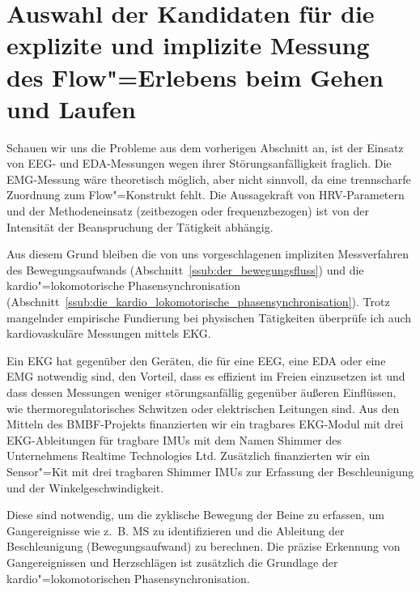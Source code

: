 

\section{Auswahl der Kandidaten für die explizite und implizite Messung des Flow"=Erlebens beim Gehen und Laufen} 

\label{sec:auswahl_der_kandidaten_fur_die_explizite_und_implizite_messung_des_flow_erlebens_beim_gehen_und_laufen}

Schauen wir uns die Probleme aus dem vorherigen Abschnitt an, ist der Einsatz von \acs{EEG}- und \ac{EDA}-Messungen wegen ihrer Störungsanfälligkeit fraglich. Die \ac{EMG}-Messung wäre theoretisch möglich, aber nicht sinnvoll, da eine trennscharfe Zuordnung zum Flow"=Konstrukt fehlt. Die Aussagekraft von \acs{HRV}-Parametern und der Methodeneinsatz (zeitbezogen oder frequenzbezogen) ist von der Intensität der Beanspruchung der Tätigkeit abhängig.

Aus diesem Grund bleiben die von uns vorgeschlagenen impliziten Messverfahren des Bewegungsaufwands (Abschnitt~\ref{ssub:der_bewegungsfluss}) und die kardio"=lokomotorische Phasensynchronisation (Abschnitt~\ref{ssub:die_kardio_lokomotorische_phasensynchronisation}). Trotz mangelnder empirische Fundierung bei physischen Tätigkeiten überprüfe ich auch kardiovaskuläre Messungen mittels \ac{EKG}. 

Ein \ac{EKG} hat gegenüber den Geräten, die für eine \acs{EEG}, eine \ac{EDA} oder eine \ac{EMG} notwendig sind, den Vorteil, dass es effizient im Freien einzusetzen ist und dass dessen Messungen weniger störungsanfällig gegenüber äußeren Einflüssen, wie thermoregulatorisches Schwitzen oder elektrischen Leitungen sind. Aus den Mitteln des \acs{BMBF}-Projekts finanzierten wir ein tragbares \ac{EKG}-Modul mit drei \ac{EKG}-Ableitungen für tragbare \acp{IMU} mit dem Namen Shimmer des Unternehmens Realtime Technologies Ltd. Zusätzlich finanzierten wir ein Sensor"=Kit mit drei tragbaren Shimmer \acp{IMU} zur Erfassung der Beschleunigung und der Winkelgeschwindigkeit.

Diese sind notwendig, um die zyklische Bewegung der Beine zu erfassen, um Gangereignisse wie z.~B. \ac{MS} zu identifizieren und die Ableitung der Beschleunigung (Bewegungsaufwand) zu berechnen. Die präzise Erkennung von Gangereignissen und Herzschlägen ist zusätzlich die Grundlage der kardio"=lokomotorischen Phasensynchronisation. 

